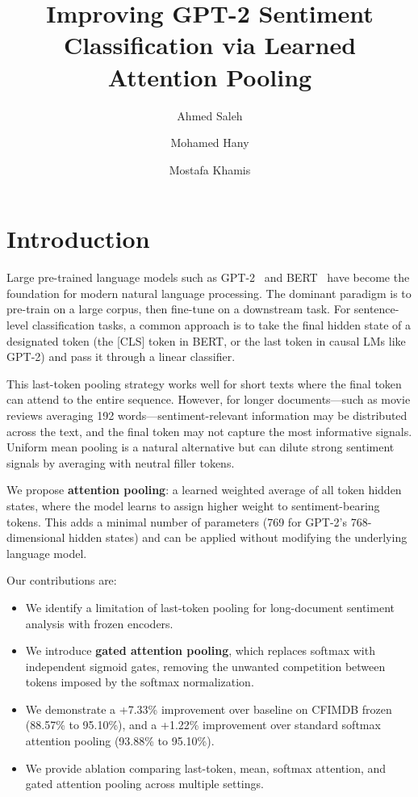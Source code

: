 \documentclass[9pt,twocolumn,twoside,lineno]{gsag3jnl}
\title{Improving GPT-2 Sentiment Classification via Learned Attention Pooling}
\author[$\ast$,1]{Ahmed Saleh}
\author[1]{Mohamed Hany}
\author[1]{Mostafa Khamis}
\affil[1]{AIU -- AIE241}
\begin{document}
\maketitle
\thispagestyle{firststyle}
\firstpagefootnote
\vspace{-13pt}

\section{Introduction}

Large pre-trained language models such as GPT-2~\citep{radford2019language} and BERT~\citep{devlin2019bert} have become the foundation for modern natural language processing. The dominant paradigm is to pre-train on a large corpus, then fine-tune on a downstream task. For sentence-level classification tasks, a common approach is to take the final hidden state of a designated token (the [CLS] token in BERT, or the last token in causal LMs like GPT-2) and pass it through a linear classifier.

This last-token pooling strategy works well for short texts where the final token can attend to the entire sequence. However, for longer documents---such as movie reviews averaging 192 words---sentiment-relevant information may be distributed across the text, and the final token may not capture the most informative signals. Uniform mean pooling is a natural alternative but can dilute strong sentiment signals by averaging with neutral filler tokens.

We propose \textbf{attention pooling}: a learned weighted average of all token hidden states, where the model learns to assign higher weight to sentiment-bearing tokens. This adds a minimal number of parameters (769 for GPT-2's 768-dimensional hidden states) and can be applied without modifying the underlying language model.

Our contributions are:
\begin{itemize}
\item We identify a limitation of last-token pooling for long-document sentiment analysis with frozen encoders.
\item We introduce \textbf{gated attention pooling}, which replaces softmax with independent sigmoid gates, removing the unwanted competition between tokens imposed by the softmax normalization.
\item We demonstrate a +7.33\% improvement over baseline on CFIMDB frozen (88.57\% to 95.10\%), and a +1.22\% improvement over standard softmax attention pooling (93.88\% to 95.10\%).
\item We provide ablation comparing last-token, mean, softmax attention, and gated attention pooling across multiple settings.
\end{itemize}
\end{document}
